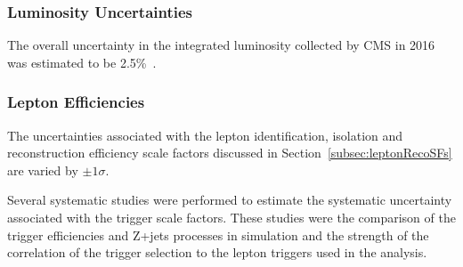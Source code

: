 \subsubsection*{Luminosity Uncertainties}




The overall uncertainty in the integrated luminosity collected by CMS in 2016 was estimated to be 2.5\%~\cite{CMS:2017_lumi}.


\subsubsection*{Lepton Efficiencies}
The uncertainties associated with the lepton identification, isolation and reconstruction efficiency scale factors discussed in Section~\ref{subsec:leptonRecoSFs} are varied by $\pm 1 \sigma$.

Several systematic studies were performed to estimate the systematic uncertainty associated with the trigger scale factors.
These studies were the comparison of the trigger efficiencies \ttbar and Z+jets processes in simulation and the strength of the correlation of the \MET trigger selection to the lepton triggers used in the analysis.

